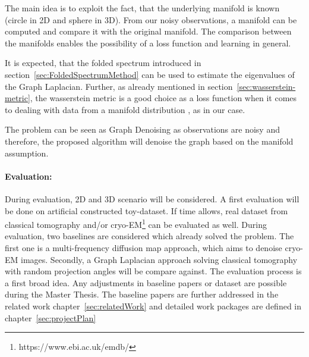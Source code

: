 The main idea is to exploit the fact, that the underlying manifold is known (circle in 2D and sphere in 3D). 
From our noisy observations, a manifold can be computed and compare it with the original manifold.
The comparison between the manifolds enables the possibility of a loss function and learning in general.

It is expected, that the folded spectrum \cite{foldedSpectrumMethod} introduced in section~\ref{sec:FoldedSpectrumMethod}
can be used to estimate the eigenvalues of the Graph Laplacian.
Further, as already mentioned in section~\ref{sec:wasserstein-metric}, the wasserstein metric is a good choice
as a loss function when it comes to dealing with data from a manifold distribution \cite{wassersteinGAN}, as in our case. 

The problem can be seen as Graph Denoising as observations are noisy and therefore, the proposed algorithm 
will denoise the graph based on the manifold assumption. 


\paragraph{Evaluation:}
During evaluation, 2D and 3D scenario will be considered. A first evaluation will be done on artificial constructed
toy-dataset. If time allows, real dataset from classical tomography and/or cryo-EM\footnote{https://www.ebi.ac.uk/emdb/} can be evaluated as well.
During evaluation, two baselines are considered which already solved the problem. The first one is a multi-frequency diffusion 
map approach\cite{multiDiffusionMaps, cryoEmMutliDM}, which aims to denoise cryo-EM images. 
Secondly, \cite{LaplaceRandomProjections} a Graph Laplacian approach solving classical tomography with random projection angles will be compare against.
The evaluation process is a first broad idea. Any adjustments in baseline papers or dataset are possible during 
the Master Thesis. The baseline papers are further addressed in the related work chapter~\ref{sec:relatedWork}
and detailed work packages are defined in chapter~\ref{sec:projectPlan}
